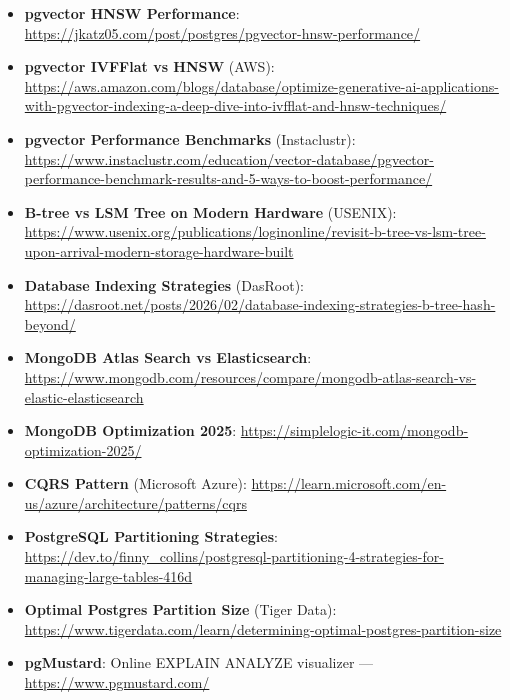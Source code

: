 \documentclass[12pt,a4paper]{article}
\begin{document}
\begin{itemize}
    \item \textbf{pgvector HNSW Performance}: \url{https://jkatz05.com/post/postgres/pgvector-hnsw-performance/}
    \item \textbf{pgvector IVFFlat vs HNSW} (AWS): \url{https://aws.amazon.com/blogs/database/optimize-generative-ai-applications-with-pgvector-indexing-a-deep-dive-into-ivfflat-and-hnsw-techniques/}
    \item \textbf{pgvector Performance Benchmarks} (Instaclustr): \url{https://www.instaclustr.com/education/vector-database/pgvector-performance-benchmark-results-and-5-ways-to-boost-performance/}
    \item \textbf{B-tree vs LSM Tree on Modern Hardware} (USENIX): \url{https://www.usenix.org/publications/loginonline/revisit-b-tree-vs-lsm-tree-upon-arrival-modern-storage-hardware-built}
    \item \textbf{Database Indexing Strategies} (DasRoot): \url{https://dasroot.net/posts/2026/02/database-indexing-strategies-b-tree-hash-beyond/}
    \item \textbf{MongoDB Atlas Search vs Elasticsearch}: \url{https://www.mongodb.com/resources/compare/mongodb-atlas-search-vs-elastic-elasticsearch}
    \item \textbf{MongoDB Optimization 2025}: \url{https://simplelogic-it.com/mongodb-optimization-2025/}
    \item \textbf{CQRS Pattern} (Microsoft Azure): \url{https://learn.microsoft.com/en-us/azure/architecture/patterns/cqrs}
    \item \textbf{PostgreSQL Partitioning Strategies}: \url{https://dev.to/finny_collins/postgresql-partitioning-4-strategies-for-managing-large-tables-416d}
    \item \textbf{Optimal Postgres Partition Size} (Tiger Data): \url{https://www.tigerdata.com/learn/determining-optimal-postgres-partition-size}
    \item \textbf{pgMustard}: Online EXPLAIN ANALYZE visualizer --- \url{https://www.pgmustard.com/}
\end{itemize}
\end{document}
